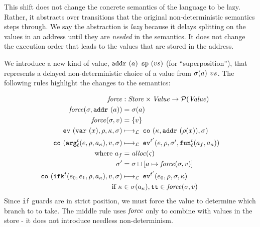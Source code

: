 \documentclass[9pt]{sigplanconf} %
\begin{document}
This shift does not change the concrete semantics of the language to be lazy.
%
Rather, it abstracts over transitions that the original non-deterministic semantics steps through.
%
We say the abstraction is \emph{lazy} because it delays splitting on the values in an address until they are \emph{needed} in the semantics.
%
It does not change the execution order that leads to the values that are stored in the address.

We introduce a new kind of value,
\spchoice
{${\tt addr}{\ }({a})$}
{${\tt sp}{\ }({v{s}})$ (for ``superposition'')},
%
that represents a delayed non-deterministic choice of a value from
\spchoice
{$\sigma(a)$}
{$v{s}$}.
%
The following rules highlight the changes to the semantics:

\renewcommand{\ext}{\mathit{ext}}
{\small
\begin{align*}
\spchoice
{\force &: \Store \times \Value \to \Set(\Value) \\
 \force(\msto,\saddr{\maddr}) &= \msto(\maddr) \\
 \force(\msto,\mval) &= \setof{\mval}}
{\force &: \Value \to \Set(\Value) \\
 \force(\superposition{\mval{s}}) &= \mval{s} \\
 \force(\mval) &= \{\mval\}}
\\
%
\ev{\svar{\mvar},\menv,\mkont,\msto} &\lmachstep\;
\spchoice
{\co{\mkont,\saddr{\menv(\mvar)},\msto}}
{\co{\mkont,\superposition{\msto(\menv(\mvar))},\msto}} \\
%
\co{\kar[^\mcntr_\mlab]{\mexp,\menv,\mkaddr},\mval,\msto}
&\lmachstep\;
\ev[^{\mcntr'}]{\mexp,\menv,\msto',\kfn[^\mcntr_\mlab]{\maddr_f,\mkaddr}} \\
\text{ where }
\maddr_f &= \alloc(\mstate) \\
\msto' &=
\spchoice
{\msto \sqcup[\maddr \mapsto \force(\msto,\mval)]}
{\msto \sqcup[\maddr \mapsto \force(\mval)]} \\
%
\co{\kif[^\mcntr]{\mexpi0,\mexpi1,\menv,\mkaddr},\mval,\msto}
&\lmachstep\;
\ev[^{\mcntr'}]{\mexpi0,\menv,\msto,\mkont} \\
\text{ if } \mkont &\in \msto(\mkaddr),
            \strue \in \spchoice{\force(\msto,\mval)}{\force(\mval)}
\end{align*}}
Since {\tt if} guards are in strict position, we must force the value to determine which branch to to take.
%
The middle rule uses $\mathit{force}$ only to combine with values in the store - it does not introduce needless non-determinism.
\end{document}
